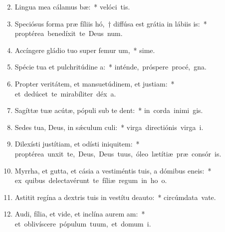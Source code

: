 \begin{flushleft}
\begin{enumerate}[leftmargin=*]
\setcounter{enumi}{1}

\item Lingua mea cálamus bæ:~* \mbox{velóci tis.}

\item Speciósus forma præ fíliis hó,~† diffúsa est grátia in lábiis is:~* \mbox{proptérea benedíxit te Deus  num.}

\item Accíngere gládio tuo super femur um,~* \mbox{sime.}

\item Spécie tua et pulchritúdine a:~* \mbox{inténde, próspere procé,  gna.}

\item Propter veritátem, et mansuetúdinem, et justiam:~* \mbox{et dedúcet te mirabíliter déx a.}

\item Sagíttæ tuæ acútæ, pópuli sub te dent:~* \mbox{in corda inimi gis.}

\item Sedes tua, Deus, in sǽculum culi:~* \mbox{virga directiónis virga  i.}

\item Dilexísti justítiam, et odísti iniquitem:~* \mbox{proptérea unxit te, Deus, Deus tuus, óleo lætítiæ præ consór is.}

\item Myrrha, et gutta, et cásia a vestiméntis tuis, a dómibus eneis:~* \mbox{ex quibus delectavérunt te fíliæ regum in ho o.}

\item Astitit regína a dextris tuis in vestítu deauto:~* \mbox{circúmdata vate.}

\item Audi, fília, et vide, et inclína aurem am:~* \mbox{et oblivíscere pópulum tuum, et domum  i.}


\end{enumerate}
\end{flushleft}
